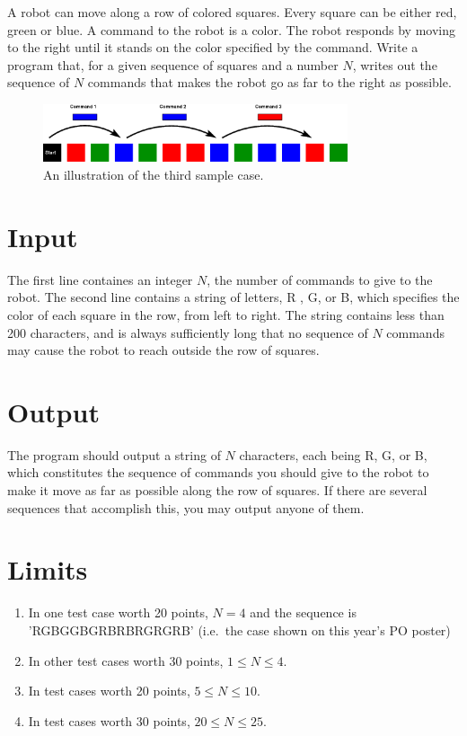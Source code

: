 
A robot can move along a row of colored squares. Every square can 
be either red, green or blue. A command to the robot is a color. The robot responds
by moving to the right until it stands on the color specified by the command. Write a program that,
for a given sequence of squares and a number $N$, writes out the sequence of $N$ commands that
makes the robot go as far to the right as possible.

\begin{figure}[ht!]
\centering
\includegraphics[width=0.8\textwidth]{fargrobot_eng.png}
\caption{An illustration of the third sample case.}
\label{overflow}
\end{figure}


\section*{Input}
The first line containes an integer $N$, the number of commands to give to the robot.
The second line contains a string of letters, R , G, or B, which specifies the color
of each square in the row, from left to right. The string contains less than
200 characters, and is always sufficiently long that no sequence of 
$N$ commands may cause the robot to reach outside the row of squares.

\section*{Output}

The program should output a string of $N$ characters, each being R, G,
or B, which constitutes the sequence of commands you should give to the robot to
make it move as far as possible along the row of squares. If there are several sequences that
accomplish this, you may output anyone of them.

\section*{Limits}

\begin{enumerate}
\item In one test case worth 20 points, $N=4$ and the sequence is 
  'RGBGGBGRBRBRGRGRB' (i.e.\ the case shown on this year's PO poster)
\item In other test cases worth 30 points, $1 \le N \le 4$.
\item In test cases worth 20 points, $5 \le N \le 10$. 
\item In test cases worth 30 points, $20 \le N \le 25$.
\end{enumerate}

